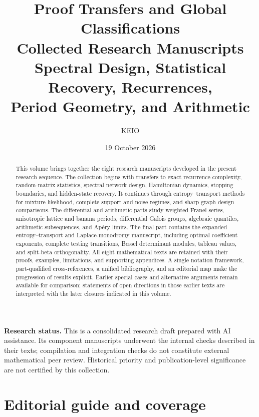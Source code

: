 \documentclass[11pt,a4paper]{article}
\theoremstyle{definition}
\theoremstyle{remark}
\numberwithin{equation}{section}
\begin{document}
\title{Proof Transfers and Global Classifications\\[6pt]
\large Collected Research Manuscripts\\
Spectral Design, Statistical Recovery, Recurrences,\\
Period Geometry, and Arithmetic}
\author{KEIO}
\date{19 October 2026}
\maketitle
\begin{abstract}
This volume brings together the eight research manuscripts developed in
the present research sequence. The collection begins with transfers to
exact recurrence complexity, random-matrix statistics, spectral network
design, Hamiltonian dynamics, stopping boundaries, and hidden-state
recovery. It continues through entropy--transport methods for mixture
likelihood, complete support and noise regimes, and sharp graph-design
comparisons. The differential and arithmetic parts study weighted Franel
series, anisotropic lattice and banana periods, differential Galois groups,
algebraic quantiles, arithmetic subsequences, and Ap\'ery limits.
The final part contains the expanded entropy--transport and
Laplace-monodromy manuscript, including optimal coefficient exponents,
complete testing transitions, Bessel determinant modules, tableau values,
and split-beta orthogonality.
All eight mathematical texts are retained with their proofs, examples,
limitations, and supporting appendices. A single notation framework,
part-qualified cross-references, a unified bibliography, and an editorial
map make the progression of results explicit. Earlier special cases and
alternative arguments remain available for comparison; statements of
open directions in those earlier texts are interpreted with the later
closures indicated in this volume.
\end{abstract}

\noindent\textbf{Research status.} This is a consolidated research draft
prepared with AI assistance. Its component manuscripts underwent the
internal checks described in their texts; compilation and integration
checks do not constitute external mathematical peer review. Historical
priority and publication-level significance are not certified by this
collection.
\clearpage
\section*{Editorial guide and coverage}
\end{document}

